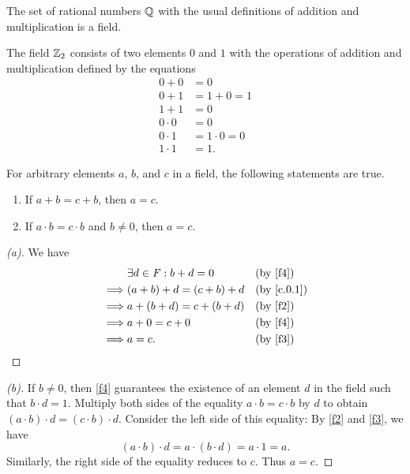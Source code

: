 \begin{eg}\label{c.0.3}
  The set of rational numbers \(\mathbb{Q}\) with the usual definitions of addition and multiplication is a field.
\end{eg}

\begin{eg}\label{c.0.4}
  The field \(\mathbb{Z}_2\) consists of two elements \(0\) and \(1\) with the operations of addition and multiplication defined by the equations
  \begin{align*}
    0 + 0     & = 0             \\
    0 + 1     & = 1 + 0 = 1     \\
    1 + 1     & = 0             \\
    0 \cdot 0 & = 0             \\
    0 \cdot 1 & = 1 \cdot 0 = 0 \\
    1 \cdot 1 & = 1.
  \end{align*}
\end{eg}

\begin{thm}\label{c.1}
  For arbitrary elements \(a\), \(b\), and \(c\) in a field, the following statements are true.
  \begin{enumerate}
    \item If \(a + b = c + b\), then \(a = c\).
    \item If \(a \cdot b = c \cdot b\) and \(b \neq 0\), then \(a = c\).
  \end{enumerate}
\end{thm}

\begin{proof}[(a)]
  We have
  \begin{align*}
             & \exists d \in \F : b + d = 0 &  & \text{(by \ref{f4})}     \\
    \implies & (a + b) + d = (c + b) + d    &  & \text{(by \cref{c.0.1})} \\
    \implies & a + (b + d) = c + (b + d)    &  & \text{(by \ref{f2})}     \\
    \implies & a + 0 = c + 0                &  & \text{(by \ref{f4})}     \\
    \implies & a = c.                       &  & \text{(by \ref{f3})}
  \end{align*}
\end{proof}

\begin{proof}[(b)]
  If \(b \neq 0\), then \ref{f4} guarantees the existence of an element \(d\) in the field such that \(b \cdot d = 1\).
  Multiply both sides of the equality \(a \cdot b = c \cdot b\) by \(d\) to obtain \((a \cdot b) \cdot d = (c \cdot b) \cdot d\).
  Consider the left side of this equality:
  By \ref{f2} and \ref{f3}, we have
  \[
    (a \cdot b) \cdot d = a \cdot (b \cdot d) = a \cdot 1 = a.
  \]
  Similarly, the right side of the equality reduces to \(c\).
  Thus \(a = c\).
\end{proof}


